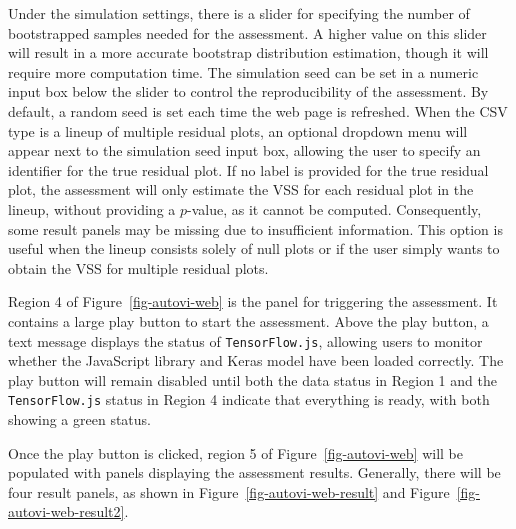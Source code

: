 \documentclass[
doublespace,
  times]{anzsauth}
\begin{document}
Under the simulation settings, there is a slider for specifying the
number of bootstrapped samples needed for the assessment. A higher value
on this slider will result in a more accurate bootstrap distribution
estimation, though it will require more computation time. The simulation
seed can be set in a numeric input box below the slider to control the
reproducibility of the assessment. By default, a random seed is set each
time the web page is refreshed. When the CSV type is a lineup of
multiple residual plots, an optional dropdown menu will appear next to
the simulation seed input box, allowing the user to specify an
identifier for the true residual plot. If no label is provided for the
true residual plot, the assessment will only estimate the VSS for each
residual plot in the lineup, without providing a \(p\)-value, as it
cannot be computed. Consequently, some result panels may be missing due
to insufficient information. This option is useful when the lineup
consists solely of null plots or if the user simply wants to obtain the
VSS for multiple residual plots.

Region 4 of Figure~\ref{fig-autovi-web} is the panel for triggering the
assessment. It contains a large play button to start the assessment.
Above the play button, a text message displays the status of
\texttt{TensorFlow.js}, allowing users to monitor whether the JavaScript
library and Keras model have been loaded correctly. The play button will
remain disabled until both the data status in Region 1 and the
\texttt{TensorFlow.js} status in Region 4 indicate that everything is
ready, with both showing a green status.

Once the play button is clicked, region 5 of Figure~\ref{fig-autovi-web}
will be populated with panels displaying the assessment results.
Generally, there will be four result panels, as shown in
Figure~\ref{fig-autovi-web-result} and
Figure~\ref{fig-autovi-web-result2}.
\end{document}
